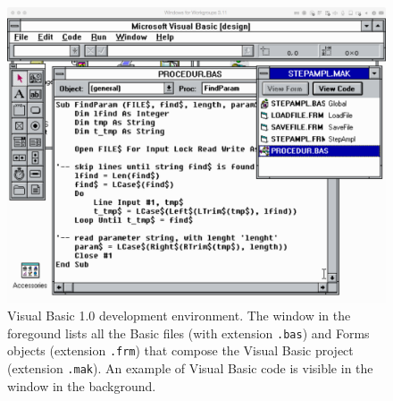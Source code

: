 \begin{supplement}

\begin{figure}[p]
	\centering
	\includegraphics[width = \textwidth]{figures/vb-project.png}
	\caption{Visual Basic 1.0 development environment. The window in the foregound lists all the Basic files (with extension \texttt{.bas}) and Forms objects (extension \texttt{.frm}) that compose the Visual Basic project (extension \texttt{.mak}). An example of Visual Basic code is visible in the window in the background.}
    \label{fig:vb-project}
\end{figure}

\end{supplement}

